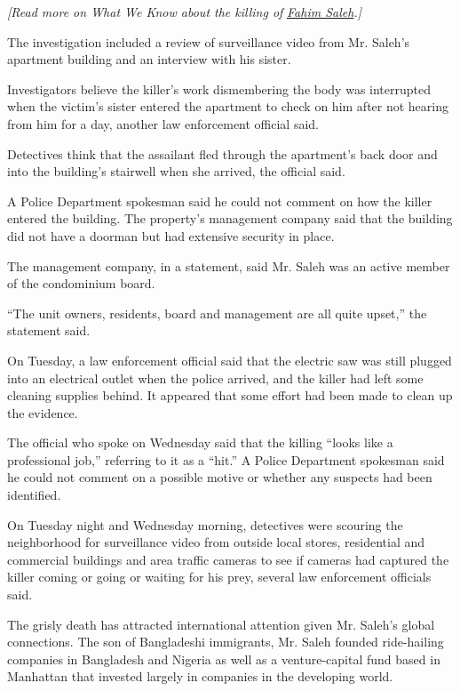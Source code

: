 \emph{{[}Read more on What We Know about the killing of}
\href{https://www.nytimes3xbfgragh.onion/2020/07/17/nyregion/fahim-saleh-killing-murder.html}{\emph{Fahim
Saleh}}\emph{.{]}}

The investigation included a review of surveillance video from Mr.
Saleh's apartment building and an interview with his sister.

Investigators believe the killer's work dismembering the body was
interrupted when the victim's sister entered the apartment to check on
him after not hearing from him for a day, another law enforcement
official said.

Detectives think that the assailant fled through the apartment's back
door and into the building's stairwell when she arrived, the official
said.

A Police Department spokesman said he could not comment on how the
killer entered the building. The property's management company said that
the building did not have a doorman but had extensive security in place.

The management company, in a statement, said Mr. Saleh was an active
member of the condominium board.

``The unit owners, residents, board and management are all quite
upset,'' the statement said.

On Tuesday, a law enforcement official said that the electric saw was
still plugged into an electrical outlet when the police arrived, and the
killer had left some cleaning supplies behind. It appeared that some
effort had been made to clean up the evidence.

The official who spoke on Wednesday said that the killing ``looks like a
professional job,'' referring to it as a ``hit.'' A Police Department
spokesman said he could not comment on a possible motive or whether any
suspects had been identified.

On Tuesday night and Wednesday morning, detectives were scouring the
neighborhood for surveillance video from outside local stores,
residential and commercial buildings and area traffic cameras to see if
cameras had captured the killer coming or going or waiting for his prey,
several law enforcement officials said.

The grisly death has attracted international attention given Mr. Saleh's
global connections. The son of Bangladeshi immigrants, Mr. Saleh founded
ride-hailing companies in Bangladesh and Nigeria as well as a
venture-capital fund based in Manhattan that invested largely in
companies in the developing world.

